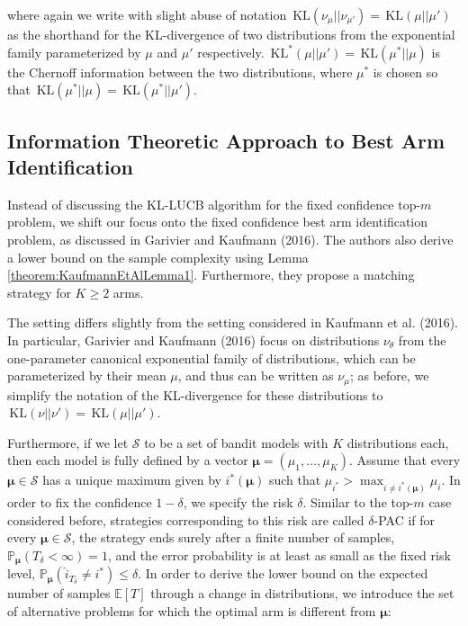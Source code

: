 \documentclass[11pt,]{article}
\newcommand{\KL}{\,\text{KL}}
\begin{document}
where again we write with slight abuse of notation
\(\KL(\nu_{\mu}|| \nu_{\mu'}) = \KL(\mu || \mu')\) as the shorthand for
the KL-divergence of two distributions from the exponential family
parameterized by \(\mu\) and \(\mu'\) respectively.
\(\KL^*(\mu || \mu') = \KL(\mu^* || \mu)\) is the Chernoff information
between the two distributions, where \(\mu^*\) is chosen so that
\(\KL(\mu^* || \mu) = \KL(\mu^* || \mu')\).

\subsection{\texorpdfstring{Information Theoretic Approach to Best Arm
Identification
\label{sec:OptimalBestArmIdentification}}{Information Theoretic Approach to Best Arm Identification }}\label{information-theoretic-approach-to-best-arm-identification}

Instead of discussing the KL-LUCB algorithm for the fixed confidence
top-\(m\) problem, we shift our focus onto the fixed confidence best arm
identification problem, as discussed in Garivier and Kaufmann (2016).
The authors also derive a lower bound on the sample complexity using
Lemma \autoref{theorem:KaufmannEtAlLemma1}. Furthermore, they propose a
matching strategy for \(K \geq 2\) arms.

The setting differs slightly from the setting considered in Kaufmann et
al. (2016). In particular, Garivier and Kaufmann (2016) focus on
distributions \(\nu_{\theta}\) from the one-parameter canonical
exponential family of distributions, which can be parameterized by their
mean \(\mu\), and thus can be written as \(\nu_{\mu}\); as before, we
simplify the notation of the KL-divergence for these distributions to
\(\KL(\nu || \nu') = \KL(\mu || \mu')\).

Furthermore, if we let \(\mathcal{S}\) to be a set of bandit models with
\(K\) distributions each, then each model is fully defined by a vector
\(\bm{\mu} = (\mu_1, \dots, \mu_K)\). Assume that every
\(\bm{\mu} \in \mathcal{S}\) has a unique maximum given by
\(i^*(\bm{\mu})\) such that
\(\mu_{i^*} > \max_{i \neq i^*(\bm{\mu})} \mu_i\). In order to fix the
confidence \(1-\delta\), we specify the risk \(\delta\). Similar to the
top-\(m\) case considered before, strategies corresponding to this risk
are called \(\delta\)-PAC if for every \(\bm{\mu} \in \mathcal{S}\), the
strategy ends surely after a finite number of samples,
\(\mathbb{P}_{\bm{\mu}}(T_{\delta} < \infty) = 1\), and the error
probability is at least as small as the fixed risk level,
\(\mathbb{P}_{\bm{\mu}}(\hat{i}_{T_{\delta}} \neq i^*) \leq \delta\). In
order to derive the lower bound on the expected number of samples
\(\mathbb{E}[T]\) through a change in distributions, we introduce the
set of alternative problems for which the optimal arm is different from
\(\bm{\mu}\):
\end{document}
